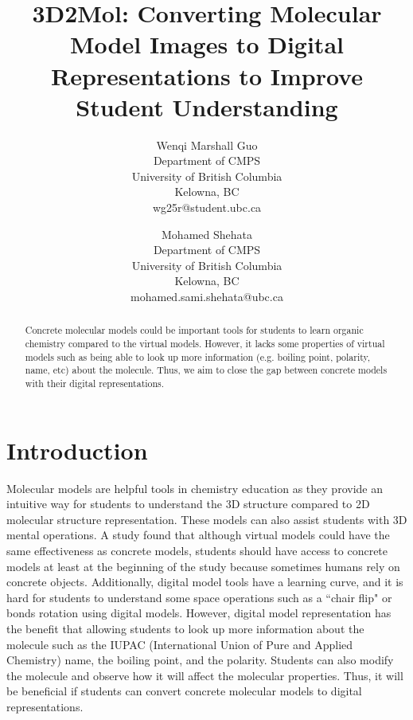 \documentclass[12pt]{article}
\begin{document}
\title{3D2Mol: Converting Molecular Model Images to Digital Representations to Improve Student Understanding}


\author{Wenqi Marshall Guo\\
Department of CMPS\\
University of British Columbia\\
Kelowna, BC\\
wg25r@student.ubc.ca 
\and
Mohamed Shehata\\
Department of CMPS\\
University of British Columbia\\
Kelowna, BC\\
mohamed.sami.shehata@ubc.ca
}

\maketitle


\begin{abstract}
Concrete molecular models could be important tools for students to learn organic chemistry compared to the virtual models. However, it lacks some properties of virtual models such as being able to look up more information (e.g. boiling point, polarity, name, etc) about the molecule. Thus, we aim to close the gap between concrete models with their digital representations.   
\end{abstract}


\section{Introduction}
Molecular models are helpful tools in chemistry education as they provide an intuitive way for students to understand the 3D structure compared to 2D molecular structure representation. These models can also assist students with 3D mental operations. 
A study \autocite{savec_evaluating_2005} found that although virtual models could have the same effectiveness as concrete models, students should have access to concrete models at least at the beginning of the study because sometimes humans rely on concrete objects. Additionally, digital model tools have a learning curve, and it is hard for students to understand some space operations such as a ``chair flip" or bonds rotation using digital models. 
However, digital model representation has the benefit that allowing students to look up more information about the molecule such as the IUPAC (International Union of Pure and Applied Chemistry) name, the boiling point, and the polarity. Students can also modify the molecule and observe how it will affect the molecular properties. Thus, it will be beneficial if students can convert concrete molecular models to digital representations. 
\end{document}
